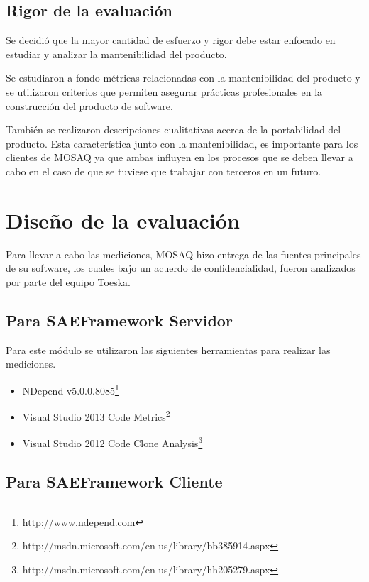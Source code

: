 \subsection{Rigor de la evaluación}

Se decidió que la mayor cantidad de esfuerzo y rigor debe estar enfocado en estudiar y
analizar la mantenibilidad del producto. 

Se estudiaron a fondo métricas relacionadas con la mantenibilidad del producto y se
utilizaron criterios que permiten asegurar prácticas profesionales en la construcción
del producto de software.

También se realizaron descripciones cualitativas acerca de la portabilidad del producto.
Esta característica junto con la mantenibilidad, es importante para los clientes de MOSAQ
ya que ambas influyen en los procesos que se deben llevar a cabo en el caso de que se tuviese
que trabajar con terceros en un futuro.
\label{chap:validation}

\section{Diseño de la evaluación}
Para llevar a cabo las mediciones, MOSAQ hizo entrega de las fuentes principales de su software, 
los cuales bajo un acuerdo de confidencialidad, fueron analizados por parte del equipo Toeska.

\subsection{Para SAEFramework Servidor}
Para este módulo se utilizaron las siguientes herramientas para realizar las mediciones.

\begin{itemize}
\item NDepend v5.0.0.8085\footnote{http://www.ndepend.com}
\item Visual Studio 2013 Code Metrics\footnote{http://msdn.microsoft.com/en-us/library/bb385914.aspx}
\item Visual Studio 2012 Code Clone Analysis\footnote{http://msdn.microsoft.com/en-us/library/hh205279.aspx}
\end{itemize}

\subsection{Para SAEFramework Cliente}

